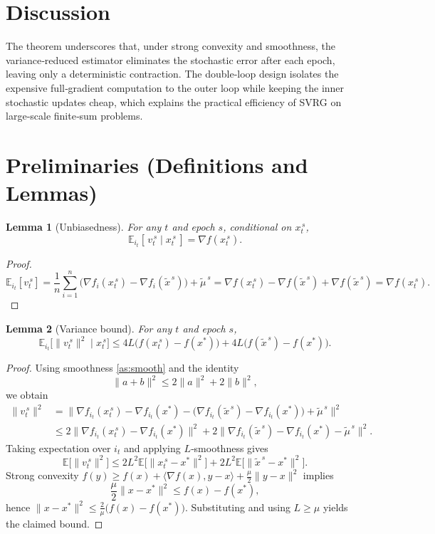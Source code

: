 \documentclass{article}
\newtheorem{lemma}{Lemma}
\newcommand{\E}{\mathbb{E}}
\begin{document}
\section*{Discussion}
The theorem underscores that, under strong convexity and smoothness, the variance‑reduced estimator eliminates the stochastic error after each epoch, leaving only a deterministic contraction. The double‑loop design isolates the expensive full‑gradient computation to the outer loop while keeping the inner stochastic updates cheap, which explains the practical efficiency of SVRG on large‑scale finite‑sum problems.

\newpage
\section*{Preliminaries (Definitions and Lemmas)}
\begin{lemma}[Unbiasedness]\label{lem:unbiased}
For any $t$ and epoch $s$, conditional on $x_{t}^{\,s}$,
\[
\E_{i_t}[\,v_{t}^{\,s}\mid x_{t}^{\,s}\,]=\nabla f(x_{t}^{\,s}).
\]
\end{lemma}
\begin{proof}
\[
\E_{i_t}[v_{t}^{\,s}]
=\frac1n\sum_{i=1}^{n}\bigl(\nabla f_i(x_{t}^{\,s})-\nabla f_i(\tilde{x}^{\,s})\bigr)+\tilde{\mu}^{\,s}
= \nabla f(x_{t}^{\,s})-\nabla f(\tilde{x}^{\,s})+\nabla f(\tilde{x}^{\,s})=\nabla f(x_{t}^{\,s}).
\] 
\end{proof}

\begin{lemma}[Variance bound]\label{lem:var}
For any $t$ and epoch $s$,
\[
\E_{i_t}\!\bigl[\|v_{t}^{\,s}\|^{2}\mid x_{t}^{\,s}\bigr]
\le 4L\bigl(f(x_{t}^{\,s})-f(x^{*})\bigr)+4L\bigl(f(\tilde{x}^{\,s})-f(x^{*})\bigr).
\]
\end{lemma}
\begin{proof}
Using smoothness \eqref{as:smooth} and the identity
\[
\|a+b\|^{2}\le 2\|a\|^{2}+2\|b\|^{2},
\]
we obtain
\[
\begin{aligned}
\|v_{t}^{\,s}\|^{2}
&=\bigl\|\nabla f_{i_t}(x_{t}^{\,s})-\nabla f_{i_t}(x^{*})-\bigl(\nabla f_{i_t}(\tilde{x}^{\,s})-\nabla f_{i_t}(x^{*})\bigr)+\tilde{\mu}^{\,s}\bigr\|^{2}\\
&\le 2\bigl\|\nabla f_{i_t}(x_{t}^{\,s})-\nabla f_{i_t}(x^{*})\bigr\|^{2}
   +2\bigl\|\nabla f_{i_t}(\tilde{x}^{\,s})-\nabla f_{i_t}(x^{*})-\tilde{\mu}^{\,s}\bigr\|^{2}.
\end{aligned}
\]
Taking expectation over $i_t$ and applying $L$‑smoothness gives
\[
\E\bigl[\|v_{t}^{\,s}\|^{2}\bigr]\le 2L^{2}\E\bigl[\|x_{t}^{\,s}-x^{*}\|^{2}\bigr]+2L^{2}\E\bigl[\|\tilde{x}^{\,s}-x^{*}\|^{2}\bigr].
\]
Strong convexity $f(y)\ge f(x)+\langle\nabla f(x),y-x\rangle+\frac{\mu}{2}\|y-x\|^{2}$ implies
\[
\frac{\mu}{2}\|x-x^{*}\|^{2}\le f(x)-f(x^{*}),
\]
hence $\|x-x^{*}\|^{2}\le\frac{2}{\mu}\bigl(f(x)-f(x^{*})\bigr)$. Substituting and using $L\ge\mu$ yields the claimed bound. \qedhere
\end{proof}
\end{document}
